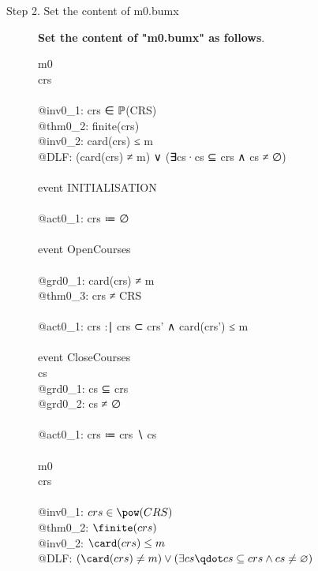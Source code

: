 \begin{description}
\item[Step 2. Set the content of m0.bumx] \textbf{Set the content of "m0.bumx" as follows}.
  \begin{center}
    \begin{Bcode}
      \ifplastex
      \Bmachine{} m0 \\
      \Bvariables{} crs \\
      \Binvariants \\
      @inv0_1: crs ∈ ℙ(CRS)\\
      \Btheorem{} @thm0_2: finite(crs) \\
      @inv0_2: card(crs) ≤ m \\
      @DLF: (card(crs) ≠ m) ∨ (∃cs·cs ⊆ crs ∧ cs ≠ ∅) \\
      \Bevents\\
      event INITIALISATION\\
      \Bthen \\
      @act0_1: crs ≔ ∅\\
      \Bend\\
      event OpenCourses\\
      \Bwhere\\
      @grd0_1: card(crs) ≠ m\\
      \Btheorem{} @thm0_3: crs ≠ CRS\\
      \Bthen\\
      @act0_1: crs :∣ crs ⊂ crs' ∧ card(crs') ≤ m\\
      \Bend\\
      \Banticipated{} event CloseCourses \\
      \Bany{} cs \Bwhere\\
      @grd0_1: cs ⊆ crs\\
      @grd0_2: cs ≠ ∅\\
      \Bthen\\
      @act0_1: crs ≔ crs ∖ cs\\
      \Bend\\
      \Bend
      \else
      \Bmachine{} m0 \\
      \Bvariables{} crs \\
      \Binvariants \\
      \Btab @inv0\_1: \(crs \in \pow(CRS)\)\\
      \Btab \Btheorem{} @thm0\_2: \(\finite(crs)\) \\
      \Btab @inv0\_2: \(\card(crs) \leq m\) \\
      \Btab @DLF: \((\card(crs) \neq m) \lor (\exists cs \qdot cs \subseteq crs \land cs \neq \emptyset)\) \\

\end{Bcode}
\end{center}
\end{description}
